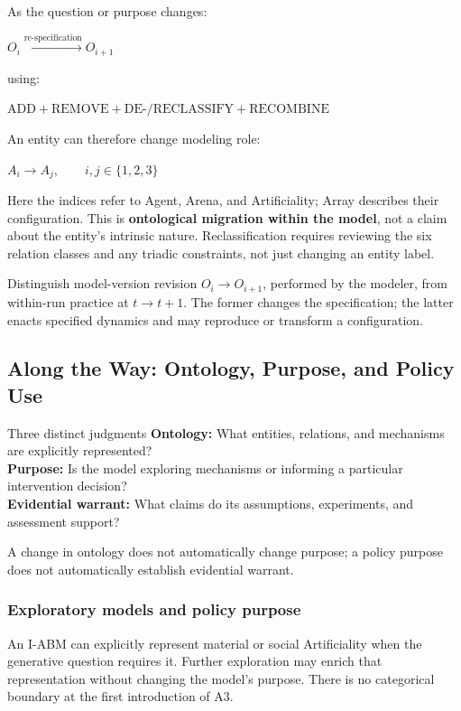 \documentclass[11pt,a4paper]{article}
\newenvironment{fitdisplay}{\par\medskip\noindent\begin{lrbox}{\displaybox}$\displaystyle}{%
$\end{lrbox}\makebox[\linewidth][c]{\ifdim\wd\displaybox>\linewidth\resizebox{\linewidth}{!}{\usebox{\displaybox}}\else\usebox{\displaybox}\fi}\par\medskip}
\begin{document}
As the question or purpose changes:

\begin{fitdisplay}
\boxed{
O_i
\xrightarrow{\text{re-specification}}
O_{i+1}
}
\end{fitdisplay}

using:

\begin{fitdisplay}
\boxed{
\text{ADD}
+
\text{REMOVE}
+
\text{DE-/RECLASSIFY}
+
\text{RECOMBINE}
}
\end{fitdisplay}

An entity can therefore change modeling role:

\begin{fitdisplay}
\boxed{
A_i\rightarrow A_j,\qquad i,j\in\{1,2,3\}
}
\end{fitdisplay}

Here the indices refer to Agent, Arena, and Artificiality; Array describes their configuration. This is \textbf{ontological migration within the model}, not a claim about the entity's intrinsic nature. Reclassification requires reviewing the six relation classes and any triadic constraints, not just changing an entity label.

Distinguish model-version revision $O_i\to O_{i+1}$, performed by the modeler, from within-run practice at $t\to t+1$. The former changes the specification; the latter enacts specified dynamics and may reproduce or transform a configuration.



\subsection{Along the Way: Ontology, Purpose, and Policy Use}

\begin{principle}{Three distinct judgments}
\textbf{Ontology:} What entities, relations, and mechanisms are explicitly represented?\\
\textbf{Purpose:} Is the model exploring mechanisms or informing a particular intervention decision?\\
\textbf{Evidential warrant:} What claims do its assumptions, experiments, and assessment support?

A change in ontology does not automatically change purpose; a policy purpose does not automatically establish evidential warrant.
\end{principle}

\subsubsection{Exploratory models and policy purpose}
An I-ABM can explicitly represent material or social Artificiality when the generative question requires it. Further exploration may enrich that representation without changing the model's purpose. There is no categorical boundary at the first introduction of A3.
\end{document}
